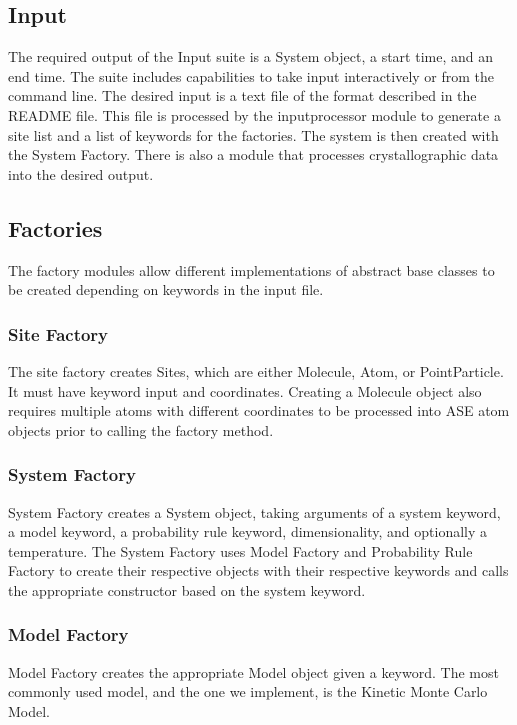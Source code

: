 \documentclass{article}
\begin{document}
\subsection{Input}

The required output of the Input suite is a System object, a start time, and an end time. The suite includes capabilities to take input interactively or from the command line. The desired input is a text file of the format described in the README file. This file is processed by the inputprocessor module to generate a site list and a list of keywords for the factories. The system is then created with the System Factory. There is also a module that processes crystallographic data into the desired output.


\subsection{Factories}

The factory modules allow different implementations of abstract base classes to be created depending on keywords in the input file.

\subsubsection{Site Factory}

The site factory creates Sites, which are either Molecule, Atom, or PointParticle. It must have keyword input and coordinates. Creating a Molecule object also requires multiple atoms with different coordinates to be processed into ASE atom objects prior to calling the factory method.

\subsubsection{System Factory}

System Factory creates a System object, taking arguments of a system keyword, a model keyword, a probability rule keyword, dimensionality, and optionally a temperature. The System Factory uses Model Factory and Probability Rule Factory to create their respective objects with their respective keywords and calls the appropriate constructor based on the system keyword.

\subsubsection{Model Factory}

Model Factory creates the appropriate Model object given a keyword. The most commonly used model, and the one we implement, is the Kinetic Monte Carlo Model.
\end{document}
